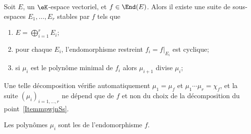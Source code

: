 \begin{theorem}        \label{THOooDOWUooOzxzxm}
    Soit \( E\), un \( \eK\)-espace vectoriel, et \( f\in \End(E)\). Alors il existe une suite de sous-espaces \( E_1,\ldots, E_r\) stables par \( f\) tels que
    \begin{enumerate}
        \item   \label{ItemmpwjnSs}
            \( E=\bigoplus_{i=1}^rE_i\);
        \item
            pour chaque \( E_i\), l'endomorphisme restreint \( f_i=f|_{E_i}\) est cyclique;
        \item
            si \( \mu_i\) est le polynôme minimal de \( f_i\) alors \( \mu_{i+1}\) divise \( \mu_i\);
    \end{enumerate}
    Une telle décomposition vérifie automatiquement \( \mu_1=\mu_f\) et \( \mu_1\cdots \mu_r=\chi_f\), et la suite \( (\mu_i)_{i=1,\ldots, r}\) ne dépend que de \( f\) et non du choix de la décomposition du point~\ref{ItemmpwjnSs}.
\end{theorem}

Les polynômes \( \mu_i\) sont les  de l'endomorphisme \( f\).


